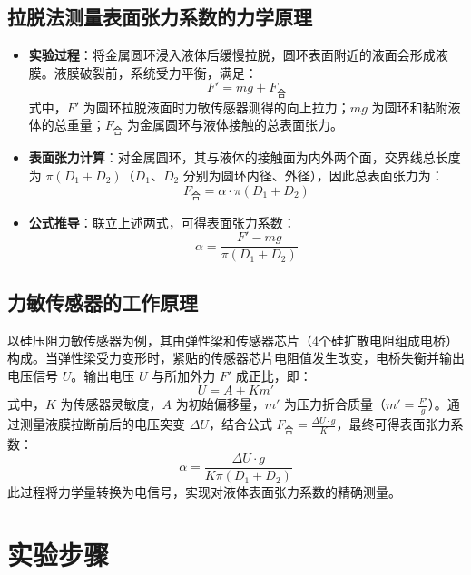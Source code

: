 \documentclass[12pt,a4paper]{article}
\begin{document}
\subsection{拉脱法测量表面张力系数的力学原理}
\begin{itemize}
\item \textbf{实验过程}：将金属圆环浸入液体后缓慢拉脱，圆环表面附近的液面会形成液膜。液膜破裂前，系统受力平衡，满足：
\begin{equation}
F' = mg + F_{\text{合}}
\end{equation}
式中，$F'$ 为圆环拉脱液面时力敏传感器测得的向上拉力；$mg$ 为圆环和黏附液体的总重量；$F_{\text{合}}$ 为金属圆环与液体接触的总表面张力。

\item \textbf{表面张力计算}：对金属圆环，其与液体的接触面为内外两个面，交界线总长度为 $\pi(D_1 + D_2)$（$D_1$、$D_2$ 分别为圆环内径、外径），因此总表面张力为：
\begin{equation}
F_{\text{合}} = \alpha \cdot \pi(D_1 + D_2)
\end{equation}

\item \textbf{公式推导}：联立上述两式，可得表面张力系数：
\begin{equation}
\alpha = \frac{F' - mg}{\pi(D_1 + D_2)}
\end{equation}
\end{itemize}

\subsection{力敏传感器的工作原理}
以硅压阻力敏传感器为例，其由弹性梁和传感器芯片（4个硅扩散电阻组成电桥）构成。当弹性梁受力变形时，紧贴的传感器芯片电阻值发生改变，电桥失衡并输出电压信号 $U$。输出电压 $U$ 与所加外力 $F'$ 成正比，即：
\begin{equation}
U = A + Km'
\end{equation}
式中，$K$ 为传感器灵敏度，$A$ 为初始偏移量，$m'$ 为压力折合质量（$m' = \frac{F'}{g}$）。通过测量液膜拉断前后的电压突变 $\Delta U$，结合公式 $F_{\text{合}} = \frac{\Delta U \cdot g}{K}$，最终可得表面张力系数：
\begin{equation}
\alpha = \frac{\Delta U \cdot g}{K\pi(D_1 + D_2)}
\end{equation}
此过程将力学量转换为电信号，实现对液体表面张力系数的精确测量。

\section{实验步骤}
\end{document}
